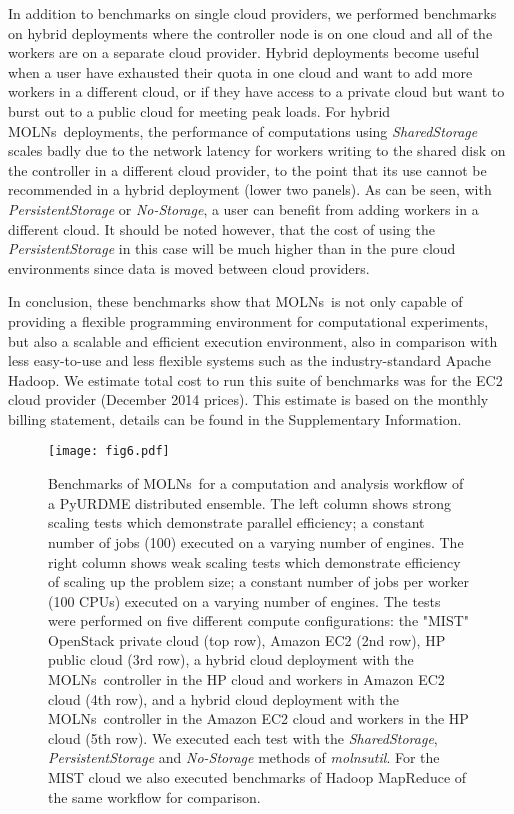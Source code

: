 \documentclass[final,leqno,onefignum,onetabnum]{siamltex1213}
\def\packagename {MOLNs}
\begin{document}
In addition to benchmarks on single cloud providers, we performed benchmarks on hybrid deployments where the controller node is on one cloud and all of the workers are on a separate cloud provider.  Hybrid deployments become useful when a user have exhausted their quota in one cloud and want to add more workers in a different cloud, or if they have access to a private cloud but want to burst out to a public cloud for meeting peak loads. For hybrid \packagename~deployments, the performance of computations using \emph{SharedStorage} scales badly due to the network latency for workers writing to the shared disk on the controller in a different cloud provider, to the point that its use cannot be recommended in a hybrid deployment (lower two panels). As can be seen, with \emph{PersistentStorage} or \emph{No-Storage}, a user can benefit from adding workers in a different cloud. It should be noted however, that the cost of using the \emph{PersistentStorage} in this case will be much higher than in the pure cloud environments since data is moved between cloud providers. 


In conclusion, these benchmarks show that \packagename~is not only capable of providing a flexible programming environment for computational experiments, but also a scalable and efficient execution environment, also in comparison with less easy-to-use and less flexible systems such as the  industry-standard Apache Hadoop. 
We estimate total cost to run this suite of benchmarks was  for the EC2 cloud provider (December 2014 prices). This estimate is based on the monthly billing statement, details can be found in the Supplementary Information.


\begin{figure}[htpb]
\begin{center}
\texttt{[image: fig6.pdf]}
\end{center}
\caption{
Benchmarks of \packagename~for a computation and analysis workflow of a PyURDME distributed ensemble.  The left column shows strong scaling tests which demonstrate parallel efficiency; a constant number of jobs (100) executed on a varying number of engines.  The right column shows weak scaling tests which demonstrate efficiency of scaling up the problem size; a constant number of jobs per worker (100 CPUs) executed on a varying number of engines. The tests were performed on five different compute configurations: the "MIST" OpenStack private cloud (top row), Amazon EC2 (2nd row), HP public cloud (3rd row), a hybrid cloud deployment with the \packagename~controller in the HP cloud and workers in Amazon EC2 cloud (4th row), and a hybrid cloud deployment with the \packagename~controller in the Amazon EC2 cloud and workers in the HP cloud (5th row).  We executed each test with the \emph{SharedStorage}, \emph{PersistentStorage} and \emph{No-Storage} methods of \emph{molnsutil}.  For the MIST cloud we also executed benchmarks of Hadoop MapReduce of the same workflow for comparison.
}
\label{fig:benchmarks}
\end{figure}
\end{document}
